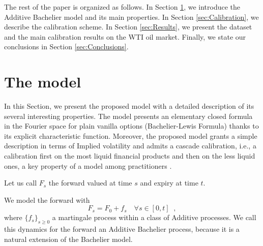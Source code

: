 \documentclass[12pt]{article}
\theoremstyle{definition}
\theoremstyle{remark}
\numberwithin{theorem}{section}
\numberwithin{proposition}{section}
\numberwithin{lemma}{section}
\numberwithin{corollary}{section}
\numberwithin{definition}{section}
\numberwithin{remark}{section}
\numberwithin{example}{section}
\newcommand{\be}{\begin{equation}}
\newcommand{\en}{\end{equation}}
\begin{document}
\smallskip

The rest of the paper is organized as follows. 
In Section \ref{sec:ModelOverview}, we introduce the Additive Bachelier model and its main properties.
In Section \ref{sec:Calibration}, we describe the calibration scheme.
In Section \ref{sec:Results}, we present the dataset and the main calibration results on the WTI oil market. 
Finally, we state our conclusions in Section \ref{sec:Conclusions}. 



\section{The model}
\label{sec:ModelOverview}

In this Section, we present the proposed model with
a detailed description of its several interesting properties. 
The model presents an elementary closed formula in the Fourier space for plain vanilla options (Bachelier-Lewis Formula) 
thanks to its explicit characteristic function.  
Moreover, the proposed model grants a simple description in terms of Implied volatility and admits a cascade calibration, 
i.e., a calibration first on the most liquid financial products and then on the less liquid ones, a key property of a model among practitioners
\citep[see, e.g.,][]{brigo2005empirically}. 

\bigskip

Let us call $F_s$ the forward valued at time $s$ and expiry at time $t$.

We model the forward with
\be
F_s = F_0 + f_s \quad  \forall s \in[0,t] \;\; ,
\label{eq:ForwardDynamics}
\en
where $\{ f_s \}_{s \ge 0}$ a martingale process within a %
class of Additive processes. 
We call this dynamics for the forward an Additive Bachelier process, because it is a natural extension of the
Bachelier model. %
\end{document}
